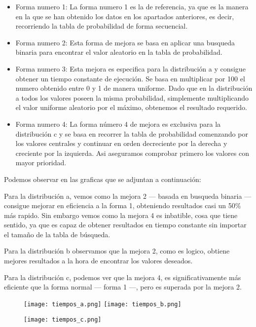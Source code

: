 \begin{itemize}
	\item Forma numero 1: La forma numero 1 es la de referencia, ya que es la manera en la que se han obtenido los datos en los apartados anteriores, es decir, recorriendo la tabla de probabilidad de forma secuencial.
	\item Forma numero 2: Esta forma de mejora se basa en aplicar una busqueda binaria para encontrar el valor aleatorio en la tabla de probabilidad.
	\item Forma numero 3: Esta mejora es especifica para la distribución a y consigue obtener un tiempo constante de ejecución. Se basa en multiplicar por 100 el numero obtenido entre 0 y 1 de manera uniforme. Dado que en la distribución a todos los valores poseen la misma probabilidad, simplemente multiplicando el valor uniforme aleatorio por el máximo, obtenemos el resultado requerido.
	\item Forma numero 4: La forma número 4 de mejora es exclusiva para la distribución c y se basa en recorrer la tabla de probabilidad comenzando por los valores centrales y continuar en orden decreciente por la derecha y creciente por la izquierda. Asi aseguramos comprobar primero los valores con mayor prioridad.
\end{itemize}

Podemos observar en las graficas que se adjuntan a continuación:

Para la distribución a, vemos como la mejora 2 --- basada en busqueda binaria --- consigue mejorar en eficiencia a la forma 1, obteniendo resultados casi un 50\% más rapido. Sin embargo vemos como la mejora 4 es inbatible, cosa que tiene sentido, ya que es capaz de obtener resultados en tiempo constante sin importar el tamaño de la tabla de búsqueda.

Para la distribución b observamos que la mejora 2, como es logico, obtiene mejores resultados a la hora de encontrar los valores deseados.

Para la distribución c, podemos ver que la mejora 4, es significativamente más eficiente que la forma normal --- forma 1 ---, pero es superada por la mejora 2.

\begin{figure}[H]
	\centering
	\texttt{[image: tiempos\_a.png]}
	\texttt{[image: tiempos\_b.png]}
\end{figure}
\begin{figure}[H]
	\centering
	\texttt{[image: tiempos\_c.png]}
\end{figure}



